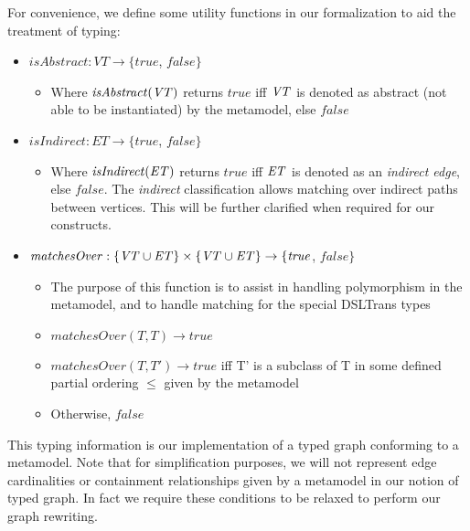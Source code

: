 For convenience, we define some utility functions in our formalization to aid the treatment of typing:

\begin{itemize}
\item $\mathit{isAbstract}: \mathit{VT} \rightarrow \{\mathit{true}$, $\mathit{false}\}$
\begin{itemize}
\item Where $\mathit{isAbstract}(\mathit{VT})$ returns $\mathit{true}$ iff $\mathit{VT}$ is denoted as abstract (not able to be instantiated) by the metamodel, else $\mathit{false}$
\end{itemize}

\item $\mathit{isIndirect}: \mathit{ET} \rightarrow \{\mathit{true}$, $\mathit{false}\}$
\begin{itemize}
\item Where $\mathit{isIndirect}(\mathit{ET})$ returns $\mathit{true}$ iff $\mathit{ET}$ is denoted as an \textit{indirect edge}, else $\mathit{false}$. The \textit{indirect} classification allows matching over indirect paths between vertices. This will be further clarified when required for our constructs.
\end{itemize}

\item $\mathit{matchesOver}: \{\mathit{VT} \cup \mathit{ET}\} \times \{\mathit{VT} \cup \mathit{ET}\} \rightarrow \{\mathit{true}$, $\mathit{false}\}$

\begin{itemize}
\item The purpose of this function is to assist in handling polymorphism in the metamodel, and to handle matching for the special DSLTrans types
\item $\mathit{matchesOver}(T, T) \rightarrow \mathit{true}$
\item $\mathit{matchesOver}(T, T') \rightarrow \mathit{true}$ iff T' is a subclass of T in some defined partial ordering $\leq$ given by the metamodel
\item Otherwise, $\mathit{false}$
\end{itemize}
\end{itemize}

This typing information is our implementation of a typed graph conforming to a metamodel. Note that for simplification purposes, we will not represent edge cardinalities or containment relationships given by a metamodel in our notion of typed graph. In fact we require these conditions to be relaxed to perform our graph rewriting.

